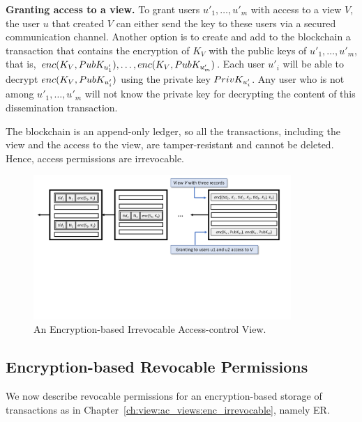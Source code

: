 \medskip
\noindent
\textbf{Granting access to a view.} To grant users $u'_1,\ldots, u'_m$ with access to a view $V$, the user $u$ that created $V$ can either send the key to these users via a secured communication channel. Another option is to create and add to the blockchain a transaction that contains the encryption of $K_V$ with the public keys of  $u'_1,\ldots, u'_m$, that is, $enc\/(K_V, PubK_{u'_1}), \ldots, enc\/(K_V, PubK_{u'_m})$. Each user $u'_i$ will be able to decrypt $enc\/(K_V, PubK_{u'_i})$ using the private key $PrivK_{u'_i}$. Any user who is not among $u'_1,\ldots, u'_m$ will not know the private key for decrypting the content of this dissemination transaction.

The blockchain is an append-only ledger, so all the transactions, including the view and the access to the view, are tamper-resistant and cannot be deleted. Hence, access permissions are irrevocable. 

   
\begin{figure}[t]
    \centering
    \includegraphics[trim=0 220 0 0, clip,width=0.87\textwidth]{diagram/view/enc_irrevocable.png}
    \caption{An Encryption-based Irrevocable Access-control View.}
    \label{diagram:view:enc_irrevocable}
\end{figure}




\subsection{Encryption-based Revocable Permissions}
\label{ch:view:ac_views:enc_revocable}

We now describe revocable permissions for an encryption-based
storage of transactions as in Chapter~\ref{ch:view:ac_views:enc_irrevocable}, namely ER.


